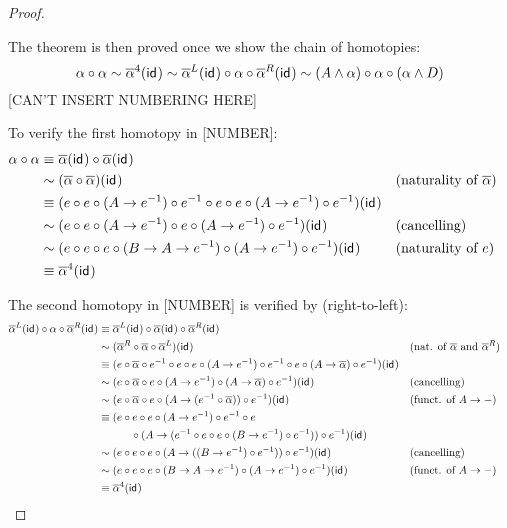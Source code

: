 \documentclass{article}
\renewcommand{\smash}{\wedge}
\renewcommand{\o}{\ensuremath{\circ}}
\newcommand{\sy}{^{-1}}
\newcommand{\alphabar}{\overline{\alpha}}
\begin{document}
\begin{proof}
\begin{center}
	\end{center}
	The theorem is then proved once we show the chain of homotopies:
	\[
	\alpha \o \alpha
	\sim \alphabar^4(\idfunc)
	\sim \alphabar^L(\idfunc) \o \alpha \o \alphabar^R(\idfunc)
	\sim (A \smash \alpha) \o \alpha \o (\alpha \smash D)
	\]
	[CAN'T INSERT NUMBERING HERE]	
	
	To verify the first homotopy in [NUMBER]:
	\begin{align*}
		\alpha \o \alpha
		&\judgeq \alphabar(\idfunc) \o \alphabar(\idfunc)\\
		&\sim (\alphabar \o \alphabar) (\idfunc) &&\text{(naturality of $\alphabar$)}\\
		&\judgeq (e \o e \o (A \to e\sy) \o e\sy \o e \o e \o (A \to e\sy) \o e\sy)(\idfunc)\\
		&\sim (e \o e \o (A \to e\sy) \o e \o (A \to e\sy) \o e\sy)(\idfunc) &&\text{(cancelling)}\\
		&\sim (e \o e \o e \o (B \to A \to e\sy) \o (A \to e\sy) \o e\sy)(\idfunc) &&\text{(naturality of $e$)}\\
		&\judgeq \alphabar^4(\idfunc)
	\end{align*}		

	The second homotopy in [NUMBER] is verified by (right-to-left):
	\begin{align*}
		\alphabar^L(\idfunc) \o \alpha \o \alphabar^R(\idfunc)
		&\judgeq \alphabar^L(\idfunc) \o \alphabar(\idfunc) \o \alphabar^R(\idfunc)\\
		&\sim (\alphabar^R \o \alphabar \o \alphabar^L)(\idfunc) &&\text{(nat. of $\alphabar$ and $\alphabar^R$)}\\
		&\judgeq (e \o \alphabar \o e\sy \o e \o e \o (A \to e\sy) \o e\sy \o e \o (A \to \alphabar) \o e\sy)(\idfunc)\\
		&\sim (e \o \alphabar \o e \o (A \to e\sy) \o (A \to \alphabar) \o e\sy)(\idfunc) &&\text{(cancelling)}\\
		&\sim (e \o \alphabar \o e \o (A \to (e\sy \o \alphabar)) \o e\sy)(\idfunc) &&\text{(funct. of $A\to -$)}\\
		&\judgeq (e \o e \o e \o (A \to e\sy) \o e\sy \o e \\
		&\hspace{3em}\o (A \to (e\sy \o e \o e \o (B \to e\sy) \o e\sy)) \o e\sy)(\idfunc)\\
		&\sim (e \o e \o e \o (A \to ((B \to e\sy) \o e\sy)) \o e\sy)(\idfunc) &&\text{(cancelling)}\\
		&\sim (e \o e \o e \o (B \to A \to e\sy) \o (A \to e\sy) \o e\sy)(\idfunc) &&\text{(funct. of $A \to -$)}\\
		&\judgeq \alphabar^4(\idfunc)
	\end{align*}
	

\end{proof}
\end{document}
